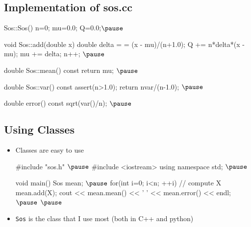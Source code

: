 
\begin{slide}
\section[-1]{Implementation of sos.cc}

\begin{cpp}
  Sos::Sos() {n=0; mu=0.0; Q=0.0;}$\pause$ 

  void Sos::add(double x) {
    double delta = = (x - mu)/(n+1.0);
    Q += n*delta*(x - mu);
    mu += delta;
    n++;
  }$\pause$

  double Sos::mean() const {return mu;} $\pause$
  
  double Sos::var() const
  {
    assert(n>1.0);
    return nvar/(n-1.0);
  }$\pause$

  double error() const
  {
    sqrt(var()/n);
  }$\pause$
\end{cpp}
\end{slide}


\begin{slide}
\section{Using Classes}

\begin{PauseHighLight}
  \begin{itemize}
  \item Classes are easy to use
    \begin{cpp}
      #include "sos.h"     $\pause$
      #include <iostream>
      using namespace std; $\pause$

      void main() {
        Sos mean;  $\pause$
        for(int i=0; i<n; ++i) {
          // compute X
          mean.add(X);
        }
        cout << mean.mean() << ' ' << mean.error() << endl;$\pause$
      }$\pause$
    \end{cpp}
  \item \texttt{Sos} is the class that I use most (both in C++ and python)\pause
  \end{itemize}
\end{PauseHighLight}
\end{slide}


